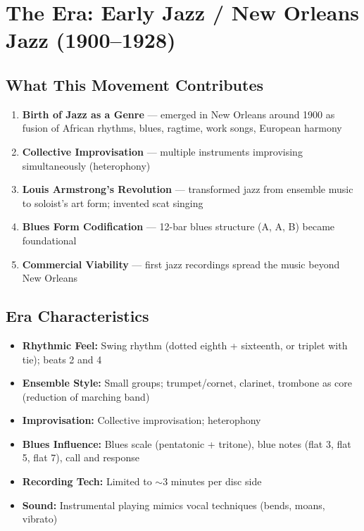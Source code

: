 \documentclass[11pt, letterpaper]{article}
\begin{document}
\section{The Era: Early Jazz / New Orleans Jazz (1900--1928)}

\subsection{What This Movement Contributes}
\begin{enumerate}
    \item \textbf{Birth of Jazz as a Genre} --- emerged in New Orleans around 1900 as fusion of African rhythms, blues, ragtime, work songs, European harmony
    \item \textbf{Collective Improvisation} --- multiple instruments improvising simultaneously (heterophony)
    \item \textbf{Louis Armstrong's Revolution} --- transformed jazz from ensemble music to soloist's art form; invented scat singing
    \item \textbf{Blues Form Codification} --- 12-bar blues structure (A, A, B) became foundational
    \item \textbf{Commercial Viability} --- first jazz recordings spread the music beyond New Orleans
\end{enumerate}

\subsection{Era Characteristics}
\begin{itemize}
    \item \textbf{Rhythmic Feel:} Swing rhythm (dotted eighth + sixteenth, or triplet with tie); beats 2 and 4
    \item \textbf{Ensemble Style:} Small groups; trumpet/cornet, clarinet, trombone as core (reduction of marching band)
    \item \textbf{Improvisation:} Collective improvisation; heterophony
    \item \textbf{Blues Influence:} Blues scale (pentatonic + tritone), blue notes (flat 3, flat 5, flat 7), call and response
    \item \textbf{Recording Tech:} Limited to $\sim$3 minutes per disc side
    \item \textbf{Sound:} Instrumental playing mimics vocal techniques (bends, moans, vibrato)
\end{itemize}
\end{document}
